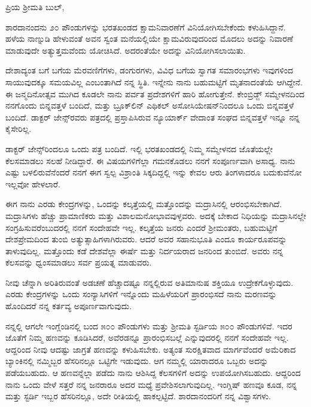 \noindent
ಪ್ರಿಯ ಶ‍್ರೀಮತಿ ಬುಲ್,

ಶಾರದಾನಂದನು ೨೦ ಪೌಂಡುಗಳನ್ನು ಭರತಖಂಡದ ಕ್ಷಾಮನಿವಾರಣೆಗೆ ವಿನಿಯೋಗಿಸಬೇಕೆಂದು ಕಳುಹಿಸಿದ್ದಾನೆ. ಹಳೆಯ ನಾಣ್ನುಡಿ ಹೇಳುವಂತೆ ಅವನ ಸ್ವಂತ ಮನೆಯಲ್ಲಿಯೇ ಕ್ಷಾಮವಿರುವುದರಿಂದ ಮೊದಲು ಅದನ್ನು ನಿವಾರಣೆ ಮಾಡುವುದೇ ಅತ್ಯುತ್ತಮವೆಂದು ಯೋಚಿಸಿದೆ. ಅದರಂತೆಯೇ ಅದನ್ನು ವಿನಿಯೋಗಿಸಲಾಯಿತು.

ದೇಶಾದ್ಯಂತ ಬಗೆ ಬಗೆಯ ಮೆರವಣಿಗೆಗಳು, ಡಂಗುರಗಳು, ವಿವಿಧ ಬಗೆಯ ಸ್ವಾಗತ ಸಮಾರಂಭಗಳು ಇವುಗಳಿಂದ ಸಾಯುವುದಕ್ಕೂ ಸಮಯವಿಲ್ಲ ಎಂಬಂತಾಗಿದೆ ನನ್ನ ಸ್ಥಿತಿ. ಇನ್ನೇನು ನಾನು ಬಹುಮಟ್ಟಿಗೆ ಮೃತನಾದಂತೆಯೆ ಆಗಿದ್ದೇನೆ. ಈ ಜನ್ಮದಿನೋತ್ಸವ ಮುಗಿದ ಕೂಡಲೇ ನಾನು ಪರ್ವತ ಪ್ರದೇಶಗಳಿಗೆ ಹಾರಿ ಹೋಗುತ್ತೇನೆ. ಕೇಂಬ್ರಿಡ್ಜ್ ಸಮ್ಮೇಳನದಿಂದ ನನಗೊಂದು ಬಿನ್ನವತ್ತಳೆ ಬಂದಿದೆ, ಮತ್ತು ಬ್ರೂಕ್‌ಲಿನ್‌ ಎಥಿಕಲ್ ಅಸೋಸಿಯೇಷನ್‌ನಿಂದಲೂ ಒಂದು ಬಿನ್ನವತ್ತಳೆ ಬಂದಿದೆ. ಡಾಕ್ಟರ್ ಜೇನ್ಸ್‌ರವರು ಪತ್ರದಲ್ಲಿ ಪ್ರಸ್ತಾಪಿಸಿರುವ ನ್ಯೂಯಾರ್ಕ್ ವೇದಾಂತ ಸಂಘದ ಬಿನ್ನವತ್ತಳೆ ಇನ್ನೂ ನನ್ನ ಕೈಸೇರಿಲ್ಲ.

ಡಾಕ್ಟರ್ ಜೇನ್ಸ್‌ರಿಂದಲೂ ಒಂದು ಪತ್ರ ಬಂದಿದೆ. ಇಲ್ಲಿ ಭರತಖಂಡದಲ್ಲಿ ನಿಮ್ಮ ಸಮ್ಮೇಳನದ ಜೊತೆಯಲ್ಲೇ ಕೆಲಸಮಾಡಲು ಸಲಹೆ ನೀಡಿದ್ದಾರೆ. ಈ ವಿಷಯಗಳಿಗೆಲ್ಲಾ ಗಮನಕೊಡಲು ನನಗೆ ಸಂಪೂರ್ಣವಾಗಿ ಅಸಾಧ್ಯ. ನಾನು ಎಷ್ಟು ಬಳಲಿರುವೆನೆಂದರೆ ನನಗೆ ಈಗ ಸ್ವಲ್ಪ ವಿಶ್ರಾಂತಿ ಸಿಕ್ಕದಿದ್ದಲ್ಲಿ ಇನ್ನು ಕೇವಲ ಆರು ತಿಂಗಳಾದರೂ ಬದುಕುವೆನೋ ಇಲ್ಲವೋ ಹೇಳಲಾರೆ.

ಈಗ ನಾನು ಎರಡು ಕೇಂದ್ರಗಳನ್ನು, ಒಂದನ್ನು ಕಲ್ಕತ್ತೆಯಲ್ಲಿ ಮತ್ತೊಂದನ್ನು ಮದ್ರಾಸಿನಲ್ಲಿ ಆರಂಭಿಸಬೇಕಾಗಿದೆ. ಮದ್ರಾಸಿಗಳು ಹೆಚ್ಚು ಪ್ರಾಮಾಣಿಕರು ಮತ್ತು ವಿಶಾಲಮನೋಭಾವವುಳ್ಳವರು. ಅದಕ್ಕೆ ಬೇಕಾದ ನಿಧಿಯನ್ನು ಮದ್ರಾಸಿನಲ್ಲೇ ಸಂಗ್ರಹಿಸುವರೆಂಬುದರಲ್ಲಿ ನನಗೆ ಸಂದೇಹವೇ ಇಲ್ಲ. ಕಲ್ಕತ್ತೆಯ ಜನರು ಎಂದರೆ ಶ‍್ರೀಮಂತರು, ಬಹುಮಟ್ಟಿಗೆ ದೇಶಪ್ರೇಮದಿಂದ ತುಂಬಿ ಅತ್ಯುತ್ಸಾಹಿಗಳಾಗಿರುವರು. ಆದರೆ ಅವರ ಸಹಾನುಭೂತಿ ಎಂದೂ ಕಾರ್ಯರೂಪವನ್ನು ತಾಳುವುದಿಲ್ಲ. ಮತ್ತೊಂದು ಕಡೆ ದೇಶವೆಲ್ಲಾ ಈರ್ಷೆ ಮತ್ತು ನಿರ್ದಯರಾದ ಜನರಿಂದ ತುಂಬಿದೆ. ಅವರು ನನ್ನ ಕೆಲಸವನ್ನು ಧ್ವಂಸಮಾಡಲು ಸರ್ವ ಪ್ರಯತ್ನ ಮಾಡುವರು.

ನೀವು ಚೆನ್ನಾಗಿ ಅರಿತಿರುವಂತೆ ಅಡಚಣೆ ಹೆಚ್ಚಾದಷ್ಟೂ ನನ್ನಲ್ಲಿರುವ ಅತಿಮಾನುಷ ಶಕ್ತಿಯೂ ಉದ್ರೇಕಗೊಳ್ಳುವುದು. ಎರಡು ಕೇಂದ್ರಗಳನ್ನು ಒಂದು ಸಂನ್ಯಾಸಿಗಳಿಗೆ ಇನ್ನೊಂದು ಮಹಿಳೆಯರಿಗೆ\enginline{-} ಪ್ರಾರಂಭಿಸದೆ ನಾನು ಮರಣವನ್ನು ಹೊಂದಿದರೆ ನನ್ನ ಕರ್ತವ್ಯ ಅಪೂರ್ಣವಾಗುವುದು.

ನನ್ನಲ್ಲಿ ಆಗಲೇ ಇಂಗ್ಲೆಂಡಿನಲ್ಲಿ ಬಂದ ೫೦೦ ಪೌಂಡುಗಳು ಮತ್ತು ಶ‍್ರೀಮತಿ ಸ್ಟರ್ಡಿಯ ೫೦೦ ಪೌಂಡುಗಳಿವೆ. ಇದರ ಜೊತೆಗೆ ನಿಮ್ಮ ಹಣವನ್ನು ಕೂಡಿಸಿದರೆ, ಅವೆರಡನ್ನೂ ಪ್ರಾರಂಭಿಸಬಲ್ಲೆ ಎನ್ನುವುದರಲ್ಲಿ ನನಗೆ ಸಂದೇಹವೇ ಇಲ್ಲ. ಆದ್ದರಿಂದ ನೀವು ಆದಷ್ಟು ಜಾಗ್ರತೆ ಹಣವನ್ನು ಕಳುಹಿಸಬೇಕು. ಅತ್ಯಂತ ಸುರಕ್ಷಿತವಾದ ಮಾರ್ಗವೆಂದರೆ ಅಮೆರಿಕಾದ ಬ್ಯಾಂಕಿನಲ್ಲಿ ನಮ್ಮಿಬ್ಬರ ಹೆಸರಿನಲ್ಲೂ ಒಟ್ಟಿಗೇ ಇಡುವುದು. ಆಗ ನಮ್ಮಲ್ಲಿ ಯಾರಾದರೂ ಒಬ್ಬರು ಅದನ್ನು ಪಡೆಯಬಹುದು. ಆ ಹಣವನ್ನೆಲ್ಲಾ ಪಡೆದು ನಾನು ಆಶಿಸಿದ್ದ ಕೆಲಸಗಳಿಗೆ ಅದನ್ನು ಉಪಯೋಗಿಸಬಹುದು. ಆದ್ದರಿಂದ ನಾನು ಒಂದು ವೇಳೆ ಸತ್ತರೆ ನನ್ನ ಜನರಾರೂ ಅದರ ಮಧ್ಯೆ ಪ್ರವೇಶಿಸಲಾಗುವುದಿಲ್ಲ. ಇಂಗ್ಲಿಷ್ ಹಣವೂ ಕೂಡ, ನನ್ನ ಮತ್ತು ಸ್ಟರ್ಡಿ ಇಬ್ಬರ ಹೆಸರಿನಲ್ಲೂ, ಅದೇ ರೀತಿಯಲ್ಲಿ ಹಾಕಲ್ಪಟ್ಟಿದೆ. ಶಾರದಾನಂದರಿಗೆ ನನ್ನ ವಿಶ್ವಾಸಗಳು.

